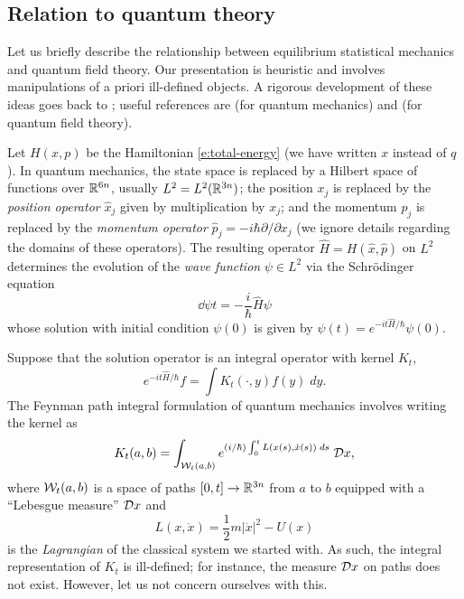 
\subsection{Relation to quantum theory}
\label{sec:quantum}

Let us briefly describe the relationship between equilibrium statistical
mechanics and quantum field theory. Our presentation is heuristic and involves
manipulations of a priori ill-defined objects. A rigorous development of these
ideas goes back to \cite{Syma69,Nelson73,OS73,OS75}; useful references are
\cite{Simon05} (for quantum mechanics) and \cite{GJ87} (for quantum
field theory).

Let $H(x, p)$ be the Hamiltonian \eqref{e:total-energy} (we have written $x$
instead of $q$). In quantum mechanics, the state space is replaced by a Hilbert
space of functions over ${\mathbb R}^{6n}$, usually $L^2 = L^2({\mathbb R}^{3n})$;
the position $x_j$ is replaced by the \emph{position operator} $\hat x_j$ given by
multiplication by $x_j$; and the momentum $p_j$ is replaced by the \emph{momentum
operator} $\hat p_j = -i \hbar \partial/\partial x_j$ (we ignore details regarding
the domains of these operators). The resulting operator $\hat H = H(\hat x, \hat p)$
on $L^2$ determines the evolution of the \emph{wave function} $\psi\in L^2$ via
the Schr\"{o}dinger equation
\begin{equation}
\dd{\psi}{t} = -\frac{i}{\hbar} \hat H \psi
\end{equation}
whose solution with initial condition $\psi(0)$ is given by
$\psi(t) = e^{-it\hat H/\hbar} \psi(0)$.

Suppose that the solution operator is an integral operator with kernel $K_t$,
\begin{equation}
e^{-it\hat H/\hbar} f = \int K_t(\cdot, y) f(y) \; dy.
\end{equation}
The Feynman path integral formulation of quantum mechanics involves writing
the kernel as
\begin{equation}
K_t(a, b)
	=
\int_{\mathcal{W}_t(a, b)} e^{(i/\hbar) \int_0^t L(x(s), \dot x(s)) \; ds} \; \mathcal{D} x,
\end{equation}
where $\mathcal{W}_t(a, b)$ is a space of paths $[0, t] \rightarrow {\mathbb R}^{3n}$ from
$a$ to $b$ equipped with a ``Lebesgue measure'' $\mathcal{D} x$ and
\begin{equation}
L(x, \dot x) = \frac{1}{2} m |\dot x|^2 - U(x)
\end{equation}
is the \emph{Lagrangian} of the classical system we started with.
As such, the integral representation of $K_t$ is ill-defined;
for instance, the measure $\mathcal{D} x$ on paths does not exist. However, let us
not concern ourselves with this.

